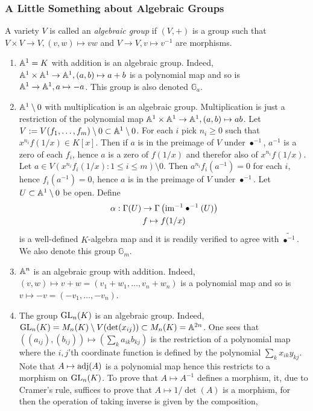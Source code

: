         \subsubsection{A Little Something about Algebraic Groups}
        \begin{definition}
            A variety $V$ is called an \textit{algebraic group} if $(V,+)$ is a group such that $V\times V\rightarrow V, (v,w)\mapsto vw$ and $V\rightarrow V, v\mapsto v^{-1}$ are morphisms.
        \end{definition}
        \begin{example}
            \begin{enumerate}
                \item $\mathbb{A}^1=K$ with addition is an algebraic group. Indeed, $\mathbb{A}^1\times \mathbb{A}^1\rightarrow \mathbb{A}^1, (a,b)\mapsto a+b$ is a polynomial map and so is $\mathbb{A}^1\rightarrow \mathbb{A}^1, a\mapsto -a$. This group is also denoted $\mathbb{G}_a$.
                \item $\mathbb{A}^1\setminus 0$ with multiplication is an algebraic group. Multiplication is just a restriction of the polynomial map $\mathbb{A}^1\times \mathbb{A}^1\rightarrow \mathbb{A}^1, (a,b)\mapsto ab$. Let $V:=V(f_1,\dots,f_m)\setminus0\subset \mathbb{A}^1\setminus0$. For each $i$ pick $n_i\geq 0$ such that $x^{n_i}f(1/x)\in K[x]$. Then if $a$ is in the preimage of $V$ under $\bullet^{-1}$, $a^{-1}$ is a zero of each $f_i$, hence $a$ is a zero of $f(1/x)$ and therefor also of $x^{n_i}f(1/x)$. Let $a\in V(x^{n_i}f_i(1/x): 1\leq i\leq m)\setminus 0$. Then $a^{n_i}f_i(a^{-1})=0$ for each $i$, hence $f_i(a^{-1})=0$, hence $a$ is in the preimage of $V$ under $\bullet^{-1}$. Let $U\subset \mathbb{A}^1\setminus 0$ be open. Define 
                \begin{gather*}
                    \alpha : \Gamma(U) \rightarrow \Gamma\left(\mathrm{im}^{-1}\bullet^{-1}( U)\right)\\
                    f\mapsto f(1/x)
                \end{gather*}
                is a well-defined $K$-algebra map and it is readily verified to agree with $\widetilde{\bullet^{-1}}$. We also denote this group $\mathbb{G}_m$. 
                \item $\mathbb{A}^n$ is an algebraic group with addition. Indeed, $(v,w)\mapsto v+w=(v_1+w_1,\dots,v_n+w_n)$ is a polynomial map and so is $v\mapsto -v = (-v_1,\dots,-v_n)$.
                \item The group $\mathrm{GL}_n(K)$ is an algebraic group. Indeed, $\mathrm{GL}_n(K)= M_n(K)\setminus V(\det(x_{ij}))\subset M_n(K)=\mathbb{A}^{2n}$. One sees that $((a_{ij}),(b_{ij}))\mapsto \left(\sum_{k} a_{ik}b_{kj}\right)$ is the restriction of a polynomial map where the $i,j$'th coordinate function is defined by the polynomial $\sum_k x_{ik}y_{kj}$. Note that $A\mapsto \mathrm{adj}(A)$ is a polynomial map hence this restricts to a morphism on $\mathrm{GL}_n(K)$. To prove that $A\mapsto A^{-1} $ defines a morphism, it, due to Cramer's rule, suffices to prove that $A\mapsto 1/\det(A)$ is a morphism, for then the operation of taking inverse is given by the composition, 

\end{enumerate}
\end{example}
